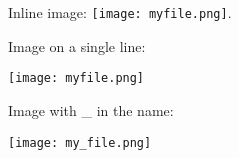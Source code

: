 Inline image: \noindent\texttt{[image: myfile.png]}.

Image on a single line:

\noindent\texttt{[image: myfile.png]}

Image with \_ in the name:

\noindent\texttt{[image: my\_file.png]}


